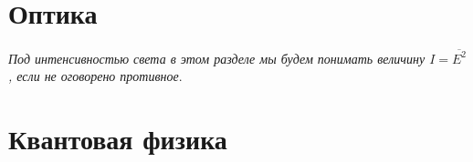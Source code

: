 \documentclass[a4paper,12pt]{article}
\begin{document}

\newpage

\newpage

\newpage

\newpage

\newpage

\newpage

\newpage

\newpage

\newpage

\newpage

\newpage

\newpage

\newpage

\newpage

\part{Оптика}

\textit{Под интенсивностью света в этом разделе мы будем понимать величину $I = \overline{E^2}$, если не оговорено противное}.

\newpage

\newpage

\newpage

\newpage

\newpage

\newpage

\newpage

\newpage

\newpage

\part{Квантовая физика}


\newpage

\newpage

\newpage

\newpage

\newpage

\newpage

\newpage

\newpage

\newpage

\newpage

\newpage

\newpage

\newpage

\newpage

\newpage

\newpage

\newpage

\newpage

\newpage

\end{document}
